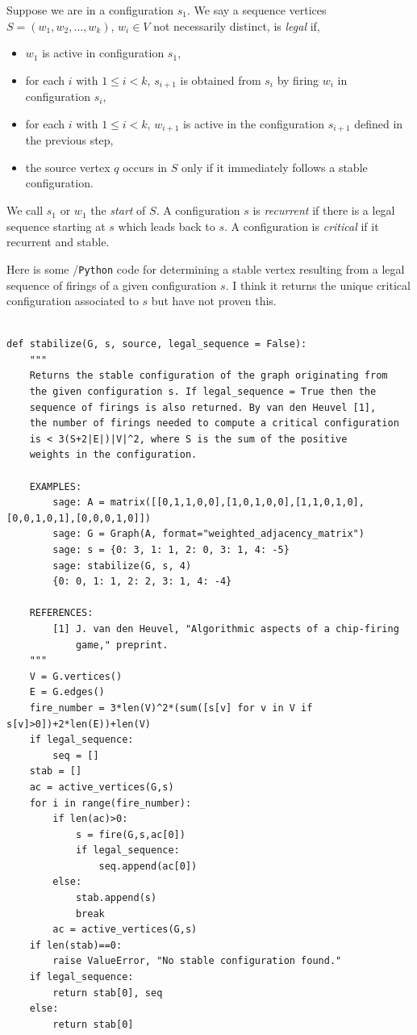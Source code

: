 Suppose we are in a configuration $s_1$.
We say a sequence vertices $S=(w_1, w_2,\dots, w_k)$,
$w_i\in V$ not necessarily distinct, is
{\it legal} if,
\begin{itemize}
\item
$w_1$ is active in configuration $s_1$,
\item
for each $i$ with $1\leq i<k$, $s_{i+1}$ is obtained
from $s_i$ by firing $w_i$ in configuration
$s_i$,
\item
for each $i$ with $1\leq i<k$, $w_{i+1}$ is active
in the configuration $s_{i+1}$ defined in the
previous step,
\item
the source vertex $q$ occurs in $S$ only if
it immediately follows a stable configuration.
\end{itemize}
We call $s_1$ or $w_1$ the {\it start}
of $S$. A configuration $s$ is {\it recurrent}
if there is a legal sequence starting at $s$ which leads back to $s$.
A configuration is {\it critical}
if it recurrent and stable.

Here is some \sage/{\tt Python} code for determining a stable
vertex resulting from a legal sequence of firings
of a given configuration $s$. I think it returns the
unique critical configuration associated to $s$ but have not
proven this.

\begin{Verbatim}[fontsize=\scriptsize,fontfamily=courier,fontshape=tt,frame=single,label=\sage]

def stabilize(G, s, source, legal_sequence = False):
    """
    Returns the stable configuration of the graph originating from
    the given configuration s. If legal_sequence = True then the
    sequence of firings is also returned. By van den Heuvel [1],
    the number of firings needed to compute a critical configuration
    is < 3(S+2|E|)|V|^2, where S is the sum of the positive
    weights in the configuration.

    EXAMPLES:
        sage: A = matrix([[0,1,1,0,0],[1,0,1,0,0],[1,1,0,1,0],[0,0,1,0,1],[0,0,0,1,0]])
        sage: G = Graph(A, format="weighted_adjacency_matrix")
        sage: s = {0: 3, 1: 1, 2: 0, 3: 1, 4: -5}
        sage: stabilize(G, s, 4)
        {0: 0, 1: 1, 2: 2, 3: 1, 4: -4}

    REFERENCES:
        [1] J. van den Heuvel, "Algorithmic aspects of a chip-firing
            game," preprint.
    """
    V = G.vertices()
    E = G.edges()
    fire_number = 3*len(V)^2*(sum([s[v] for v in V if s[v]>0])+2*len(E))+len(V)
    if legal_sequence:
        seq = []
    stab = []
    ac = active_vertices(G,s)
    for i in range(fire_number):
        if len(ac)>0:
            s = fire(G,s,ac[0])
            if legal_sequence:
                seq.append(ac[0])
        else:
            stab.append(s)
            break
        ac = active_vertices(G,s)
    if len(stab)==0:
        raise ValueError, "No stable configuration found."
    if legal_sequence:
        return stab[0], seq
    else:
        return stab[0]

\end{Verbatim}

